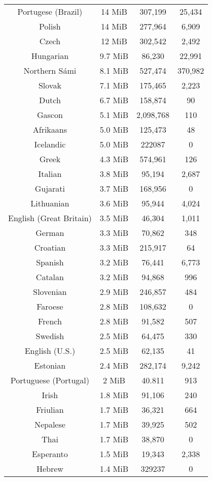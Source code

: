 \documentclass[officiallayout,final]{unihelcompling}
\begin{document}
\begin{longtable}{c|c|c|c}
    Portugese (Brazil) & 14 MiB & 307,199 & 25,434 \\
    Polish & 14 MiB & 277,964 & 6,909 \\
    Czech & 12 MiB & 302,542 & 2,492 \\
    Hungarian & 9.7 MiB & 86,230 & 22,991 \\
    Northern S\'{a}mi & 8.1 MiB & 527,474 & 370,982 \\ 
    Slovak & 7.1 MiB & 175,465 & 2,223 \\
    Dutch & 6.7 MiB & 158,874 & 90\\
    Gascon & 5.1 MiB & 2,098,768 & 110 \\
    Afrikaans & 5.0 MiB & 125,473 & 48 \\
    Icelandic & 5.0 MiB & 222087 & 0 \\
    Greek & 4.3 MiB & 574,961 & 126 \\
    Italian & 3.8 MiB & 95,194 & 2,687 \\
    Gujarati & 3.7 MiB & 168,956 & 0 \\
    Lithuanian & 3.6 MiB & 95,944 & 4,024 \\
    English (Great Britain) & 3.5 MiB & 46,304 & 1,011 \\
    German & 3.3 MiB & 70,862 & 348 \\
    Croatian & 3.3 MiB & 215,917 & 64 \\
    Spanish & 3.2 MiB & 76,441 & 6,773 \\
    Catalan & 3.2 MiB & 94,868 & 996 \\
    Slovenian & 2.9 MiB & 246,857 & 484 \\
    Faroese & 2.8 MiB & 108,632 & 0 \\
    French & 2.8 MiB & 91,582 & 507 \\
    Swedish & 2.5 MiB & 64,475 & 330 \\
    English (U.S.) & 2.5 MiB & 62,135 & 41 \\
    Estonian & 2.4 MiB & 282,174 & 9,242\\
    Portuguese (Portugal) & 2 MiB & 40.811 & 913 \\
    Irish & 1.8 MiB & 91,106 & 240 \\
    Friulian & 1.7 MiB & 36,321 & 664 \\
    Nepalese & 1.7 MiB & 39,925 & 502 \\
    Thai & 1.7 MiB & 38,870 & 0 \\
    Esperanto & 1.5 MiB & 19,343 & 2,338 \\
    Hebrew & 1.4 MiB & 329237 & 0 \\

\end{longtable}
\end{document}
